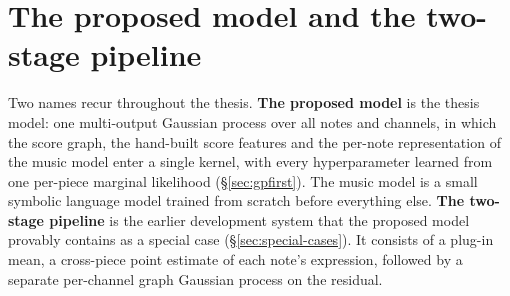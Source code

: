 \section{The proposed model and the two-stage pipeline}\label{sec:twostage}
Two names recur throughout the thesis. \textbf{The proposed model} is the
thesis model: one multi-output Gaussian process over all notes and channels,
in which the score graph, the hand-built score features and the per-note
representation of the music model enter a single kernel, with every
hyperparameter learned from one per-piece marginal likelihood
(\S\ref{sec:gpfirst}). The music model is a small symbolic language model
trained from scratch before everything else. \textbf{The two-stage
pipeline} is the earlier development system that the proposed model
provably contains as a special case (\S\ref{sec:special-cases}). It
consists of a plug-in mean, a cross-piece point estimate of each note's
expression, followed by a separate per-channel graph Gaussian process on
the residual.

